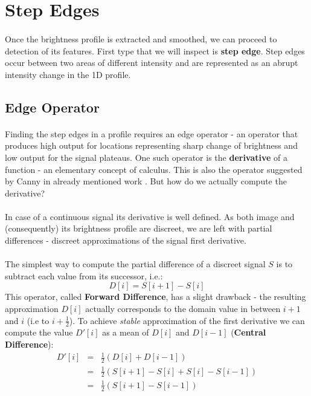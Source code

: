 \section{Step Edges}

\paragraph*{}
Once the brightness profile is extracted and smoothed, we can proceed to detection of its features. First type that we will inspect is \textbf{step edge}. Step edges occur between two areas of different intensity and are represented as an abrupt intensity change in the 1D profile.

\subsection{Edge Operator}

\paragraph*{}
Finding the step edges in a profile requires an edge operator - an operator that produces high output for locations representing sharp change of brightness and low output for the signal plateaus. One such operator is the \textbf{derivative} of a function - an elementary concept of calculus. This is also the operator suggested by Canny in already mentioned work \cite{Canny86}. But how do we actually compute the derivative? 

\paragraph*{}
In case of a continuous signal its derivative is well defined. As both image and (consequently) its brightness profile are discreet, we are left with partial differences - discreet approximations of the signal first derivative.

\paragraph*{}
The simplest way to compute the partial difference of a discreet signal $S$ is to subtract each value from its successor, i.e.:
\[
	D[i] = S[i+1]-S[i]
\]  
This operator, called \textbf{Forward Difference}, has a slight drawback - the resulting approximation $D[i]$ actually corresponds to the domain value in between $i+1$ and $i$ (i.e to $i+\frac{1}{2}$). To achieve \textit{stable} approximation of the first derivative we can compute the value $D'[i]$ as a mean of $D[i]$ and $D[i-1]$ (\textbf{Central Difference}):
\begin{eqnarray*}
D'[i] & = & \frac{1}{2}(D[i]+D[i-1]) \\
	& = & \frac{1}{2}(S[i+1]-S[i]+S[i]-S[i-1]) \\
	& = & \frac{1}{2}(S[i+1]-S[i-1])
\end{eqnarray*}

